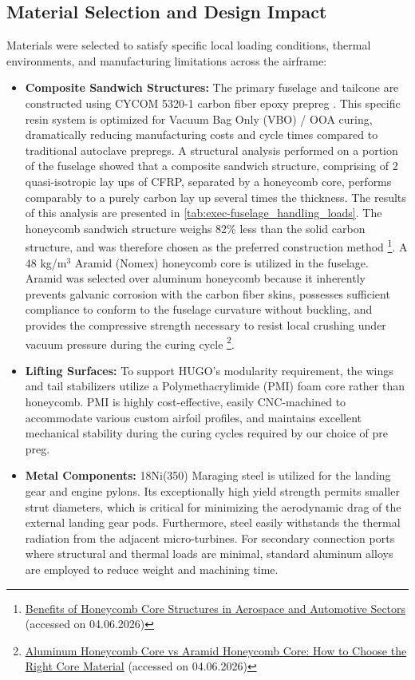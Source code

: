 \subsection*{Material Selection and Design Impact}
\label{subsec:exec-material_selection}
Materials were selected to satisfy specific local loading conditions, thermal environments, and manufacturing limitations across the airframe:
\begin{itemize}
    \item \textbf{Composite Sandwich Structures:} The primary fuselage and tailcone are constructed using CYCOM 5320-1 carbon fiber epoxy prepreg \cite{CENTEA2015132}. This specific resin system is optimized for Vacuum Bag Only (VBO) / OOA curing, dramatically reducing manufacturing costs and cycle times compared to traditional autoclave prepregs. A structural analysis performed on a portion of the fuselage showed that a composite sandwich structure, comprising of 2 quasi-isotropic lay ups of CFRP, separated by a honeycomb core, performs comparably to a purely carbon lay up several times the thickness. The results of this analysis are presented in \autoref{tab:exec-fuselage_handling_loads}. The honeycomb sandwich structure weighs 82\% less than the solid carbon structure, and was therefore chosen as the preferred construction method \footnote{\href{https://www.dmcrf.com/benefits-of-honeycomb-core-structures-in-aerospace-and-automotive-sectors/}{Benefits of Honeycomb Core Structures in Aerospace and Automotive Sectors} (accessed on 04.06.2026)}. A 48 kg/m$^3$ Aramid (Nomex) honeycomb core is utilized in the fuselage. Aramid was selected over aluminum honeycomb because it inherently prevents galvanic corrosion with the carbon fiber skins, possesses sufficient compliance to conform to the fuselage curvature without buckling, and provides the compressive strength necessary to resist local crushing under vacuum pressure during the curing cycle \footnote{\href{https://www.chalcoaluminum.com/blog/aluminum-honeycomb-core-vs-aramid-honeycomb-core-2604-zmy/}{Aluminum Honeycomb Core vs Aramid Honeycomb Core: How to Choose the Right Core Material} (accessed on 04.06.2026)}. 
    \item \textbf{Lifting Surfaces:} To support HUGO's modularity requirement, the wings and tail stabilizers utilize a Polymethacrylimide (PMI) foam core rather than honeycomb. PMI is highly cost-effective, easily CNC-machined to accommodate various custom airfoil profiles, and maintains excellent mechanical stability during the curing cycles required by our choice of pre preg.
    \item \textbf{Metal Components:} 18Ni(350) Maraging steel is utilized for the landing gear and engine pylons. Its exceptionally high yield strength permits smaller strut diameters, which is critical for minimizing the aerodynamic drag of the external landing gear pods. Furthermore, steel easily withstands the thermal radiation from the adjacent micro-turbines. For secondary connection ports where structural and thermal loads are minimal, standard aluminum alloys are employed to reduce weight and machining time. 
\end{itemize}

